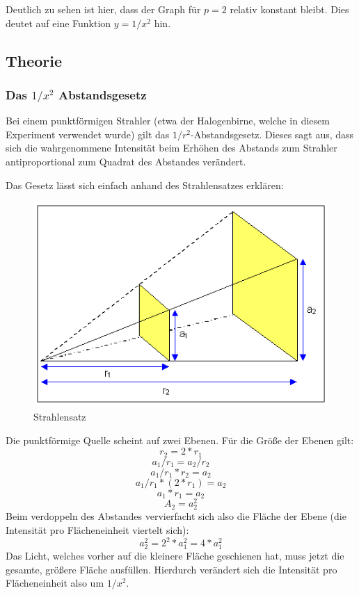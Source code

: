 \documentclass[12pt, a4paper]{article}
\begin{document}
\vspace{10mm}

Deutlich zu sehen ist hier, dass der Graph für $p=2$ relativ konstant bleibt. Dies deutet auf eine Funktion $y=1/x^2$ hin.

\newpage

\subsection{Theorie}
\subsubsection{Das $1 / x^2$ Abstandsgesetz}
Bei einem punktförmigen Strahler (etwa der Halogenbirne, welche in diesem Experiment verwendet wurde) gilt das $1/r^2$-Abstandsgesetz.
Dieses sagt aus, dass sich die wahrgenommene Intensität beim Erhöhen des Abstands zum Strahler antiproportional zum Quadrat des Abstandes verändert.

Das Gesetz lässt sich einfach anhand des Strahlensatzes erklären:

\begin{figure}[h]
    \includegraphics[width=\textwidth]{Strahlensatz.png} %
    \caption[Strahlensatz]{Strahlensatz}
\end{figure}

Die punktförmige Quelle scheint auf zwei Ebenen. Für die Größe der Ebenen gilt:
$$r_2=2*r_1$$
$$a_1 / r_1 = a_2 / r_2$$
$$a_1 / r_1 * r_2 = a_2$$
$$a_1 / r_1 * (2 * r_1) = a_2$$
$$a_1 * r_1 = a_2$$
$$A_2 = a_2^2$$
Beim verdoppeln des Abstandes vervierfacht sich also die Fläche der Ebene (die Intensität pro Flächeneinheit viertelt sich):
$$a_2^2=2^2 * a_1^2 = 4 * a_1^2$$
Das Licht, welches vorher auf die kleinere Fläche geschienen hat, muss jetzt die gesamte, größere Fläche ausfüllen. Hierdurch verändert sich die Intensität pro Flächeneinheit also um $1/x^2$.
\end{document}
